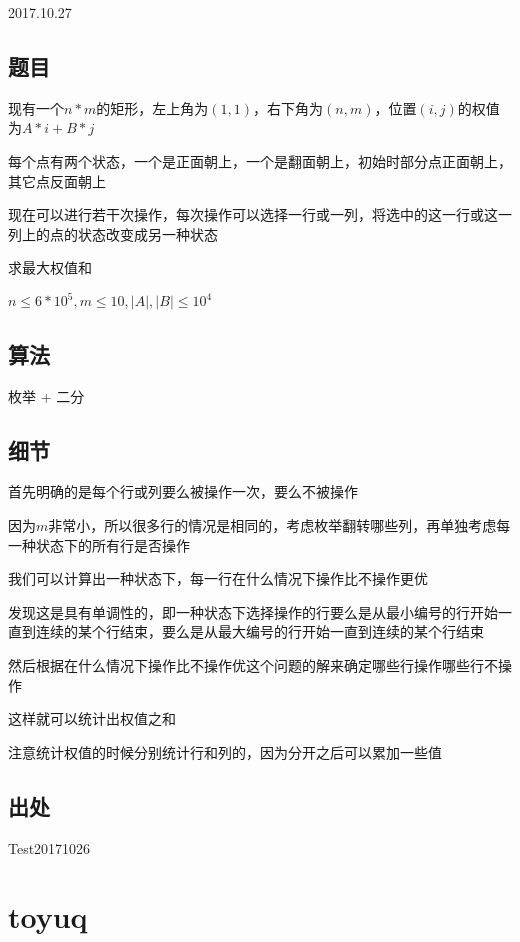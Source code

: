 \documentclass[a4paper]{article}
\begin{document}
		2017.10.27
		
	\subsection{题目}
		
		现有一个$n*m$的矩形，左上角为$(1,1)$，右下角为$(n,m)$，位置$(i,j)$的权值为$A * i + B * j$
		
		每个点有两个状态，一个是正面朝上，一个是翻面朝上，初始时部分点正面朝上，其它点反面朝上
		
		现在可以进行若干次操作，每次操作可以选择一行或一列，将选中的这一行或这一列上的点的状态改变成另一种状态
		
		求最大权值和
		
		$n \leq 6*10^5,m \leq 10 , |A|,|B| \leq 10^4$
		
	\subsection{算法}
		
		枚举 + 二分
		
	\subsection{细节}
		
		首先明确的是每个行或列要么被操作一次，要么不被操作
		
		因为$m$非常小，所以很多行的情况是相同的，考虑枚举翻转哪些列，再单独考虑每一种状态下的所有行是否操作
		
		我们可以计算出一种状态下，每一行在什么情况下操作比不操作更优
		
		发现这是具有单调性的，即一种状态下选择操作的行要么是从最小编号的行开始一直到连续的某个行结束，要么是从最大编号的行开始一直到连续的某个行结束
		
		然后根据在什么情况下操作比不操作优这个问题的解来确定哪些行操作哪些行不操作
		
		这样就可以统计出权值之和
		
		注意统计权值的时候分别统计行和列的，因为分开之后可以累加一些值
		
	\subsection{出处}
		
		Test20171026
	
	\newpage
	
	\section{toyuq}
		
\end{document}

